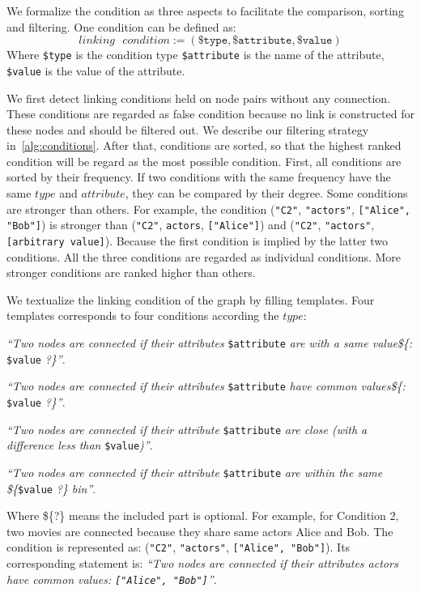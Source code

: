 We formalize the condition as three aspects to facilitate the comparison, sorting and filtering.
One condition can be defined as:
\begin{equation}
    linking\text{ }condition := ( \texttt{\$type}, \texttt{\$attribute}, \texttt{\$value} )
\end{equation}
Where \texttt{\$type} is the condition type \texttt{\$attribute} is the name of the attribute, \texttt{\$value} is the value of the attribute.

We first detect linking conditions held on node pairs without any connection.
These conditions are regarded as false condition because no link is constructed for these nodes and should be filtered out.
We describe our filtering strategy in~\ref{alg:conditions}.
After that, conditions are sorted, so that the highest ranked condition will be regard as the most possible condition.
First, all conditions are sorted by their frequency.
If two conditions with the same frequency have the same $type$ and $attribute$, they can be compared by their degree.
Some conditions are stronger than others.
For example, the condition (\texttt{"C2"}, \texttt{"actors"}, \texttt{["Alice", "Bob"]}) is stronger than (\texttt{"C2"}, \texttt{actors}, \texttt{["Alice"]}) and (\texttt{"C2"}, \texttt{"actors"}, \texttt{[arbitrary value]}).
Because the first condition is implied by the latter two conditions.
All the three conditions are regarded as individual conditions.
More stronger conditions are ranked higher than others.

We textualize the linking condition of the graph by filling templates. 
Four templates corresponds to four conditions according the $type$:
\begin{compactenum}[\textbf{C}1]
    \item \textit{``Two nodes are connected if their attributes} \texttt{\$attribute} \textit{are with a same value\$\{: }\texttt{\$value} \textit{?\}''}.
    \item \textit{``Two nodes are connected if their attributes} \texttt{\$attribute} \textit{have common values\$\{: }\texttt{\$value} \textit{?\}''}.
    \item \textit{``Two nodes are connected if their attribute} \texttt{\$attribute} \textit{are close (with a difference less than } \texttt{\$value}\textit{)''}.
    \item \textit{``Two nodes are connected if their attribute} \texttt{\$attribute} \textit{are within the same \$\{}\texttt{\$value}\textit{ ?\} bin''}.
\end{compactenum}
Where \$\{?\} means the included part is optional. 
For example, for Condition 2, two movies are connected because they share same actors Alice and Bob. 
The condition is represented as: (\texttt{"C2"}, \texttt{"actors"}, \texttt{["Alice", "Bob"]}). 
Its corresponding statement is: \textit{``Two nodes are connected if their attributes actors have common values: \texttt{["Alice", "Bob"]}''}. 

